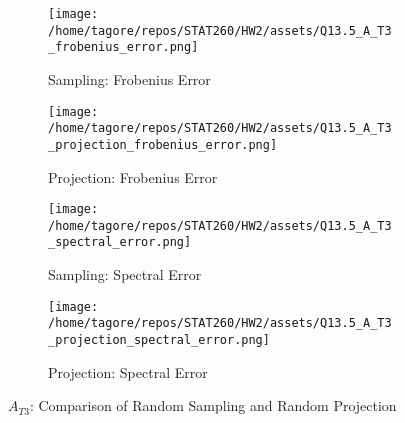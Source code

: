 \documentclass{article}
\begin{document}
\begin{figure}[H]
    \centering
    \begin{subfigure}[b]{0.48\textwidth}
        \centering
        \texttt{[image: /home/tagore/repos/STAT260/HW2/assets/Q13.5\_A\_T3\_frobenius\_error.png]}
        \caption{Sampling: Frobenius Error}
        \label{fig:T3_fs}
    \end{subfigure}
    \hfill
    \begin{subfigure}[b]{0.48\textwidth}
        \centering
        \texttt{[image: /home/tagore/repos/STAT260/HW2/assets/Q13.5\_A\_T3\_projection\_frobenius\_error.png]}
        \caption{Projection: Frobenius Error}
        \label{fig:T3_fp}
    \end{subfigure}
    
    \vspace{0.5cm}
    
    \begin{subfigure}[b]{0.48\textwidth}
        \centering
        \texttt{[image: /home/tagore/repos/STAT260/HW2/assets/Q13.5\_A\_T3\_spectral\_error.png]}
        \caption{Sampling: Spectral Error}
        \label{fig:T3_ss}
    \end{subfigure}
    \hfill
    \begin{subfigure}[b]{0.48\textwidth}
        \centering
        \texttt{[image: /home/tagore/repos/STAT260/HW2/assets/Q13.5\_A\_T3\_projection\_spectral\_error.png]}
        \caption{Projection: Spectral Error}
        \label{fig:T3_sp}
    \end{subfigure}
    
    \caption{\(A_{T3}\): Comparison of Random Sampling and Random Projection}
    \label{fig:T3_comparison}
\end{figure}





\end{document}
